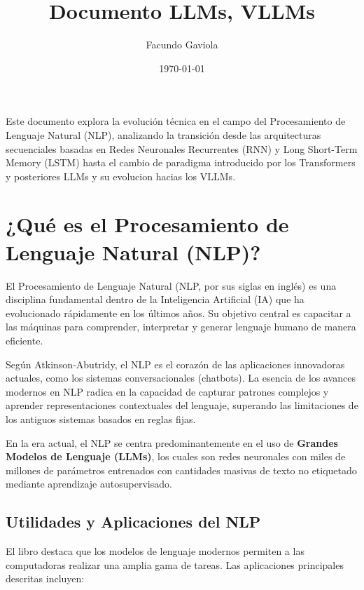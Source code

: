 \documentclass[11pt, a4paper]{article}
\title{Documento LLMs, VLLMs}
\author{Facundo Gaviola}
\date{\today}
\begin{document}
\maketitle


Este documento explora la evolución técnica en el campo del Procesamiento de Lenguaje Natural (NLP), analizando la transición desde las arquitecturas secuenciales basadas
en Redes Neuronales Recurrentes (RNN) y Long Short-Term Memory (LSTM) hasta el cambio de paradigma introducido por los Transformers y posteriores LLMs y su evolucion 
hacias los VLLMs.


\section{¿Qué es el Procesamiento de Lenguaje Natural (NLP)?}

El Procesamiento de Lenguaje Natural (NLP, por sus siglas en inglés) es una disciplina fundamental dentro de la Inteligencia Artificial (IA) que ha evolucionado rápidamente
en los últimos años. Su objetivo central es capacitar a las máquinas para comprender, interpretar y generar lenguaje humano de manera eficiente.

Según Atkinson-Abutridy, el NLP es el corazón de las aplicaciones innovadoras actuales, como los sistemas conversacionales (chatbots). La esencia de los avances modernos en
NLP radica en la capacidad de capturar patrones complejos y aprender representaciones contextuales del lenguaje, superando las limitaciones de los antiguos sistemas basados
en reglas fijas.

En la era actual, el NLP se centra predominantemente en el uso de \textbf{Grandes Modelos de Lenguaje (LLMs)}, los cuales son redes neuronales con miles de millones de
parámetros entrenados con cantidades masivas de texto no etiquetado mediante aprendizaje autosupervisado.

\subsection{Utilidades y Aplicaciones del NLP}

El libro destaca que los modelos de lenguaje modernos permiten a las computadoras realizar una amplia gama de tareas. Las aplicaciones principales descritas incluyen:
\end{document}
